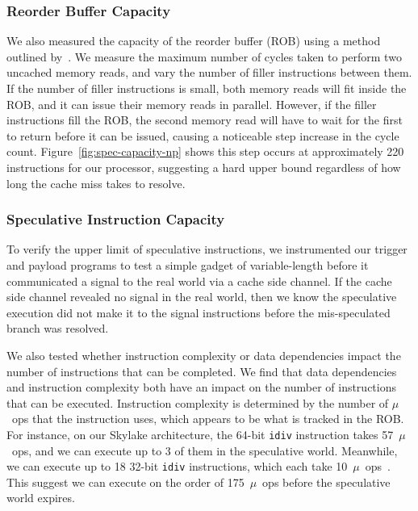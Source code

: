 \subsubsection{Reorder Buffer Capacity} \label{sssec:ROB}
We also measured the capacity of the reorder buffer (ROB) using a method
outlined by~\cite{measuring-rob}. We measure the maximum number of cycles taken
to perform two uncached memory reads, and vary the number of filler instructions
between them. If the number of filler instructions is small, both memory reads
will fit inside the ROB, and it can issue their memory reads in parallel.
However, if the filler instructions fill the ROB, the second memory read will
have to wait for the first to return before it can be issued, causing a
noticeable step increase in the cycle count. Figure~\ref{fig:spec-capacity-np}
shows this step occurs at approximately 220 instructions for our processor,
suggesting a hard upper bound regardless of how long the cache miss takes to
resolve.


\subsubsection{Speculative Instruction Capacity}

To verify the upper limit of speculative instructions, we instrumented our
trigger and payload programs to test a simple gadget of variable-length before it
communicated a signal to the real world via a cache side channel. If the cache
side channel revealed no signal in the real world, then we know the speculative
execution did not make it to the signal instructions before the mis-speculated
branch was resolved.

We also tested whether instruction complexity or data dependencies impact the
number of instructions that can be completed. We find that data dependencies and
instruction complexity both have an impact on the number of instructions that
can be executed. Instruction complexity is determined by the number of $\mu$~ops
that the instruction uses, which appears to be what is tracked in the ROB. For
instance, on our Skylake architecture, the 64-bit \texttt{idiv} instruction
takes 57~$\mu$~ops, and we can execute up to 3 of them in the speculative world.
Meanwhile, we can execute up to 18 32-bit \texttt{idiv} instructions, which each
take 10~$\mu$~ops~\cite{intel-instruction-tables}. This suggest we can execute
on the order of 175~$\mu$~ops before the speculative world expires.

